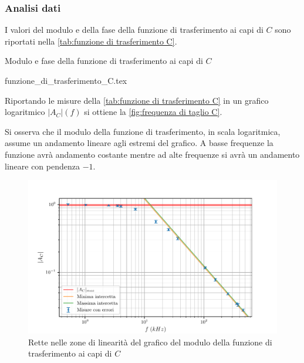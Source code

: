 \documentclass[11pt, a4paper]{article}
\numberwithin{equation}{section} %
\begin{document}
\subsubsection{Analisi dati}

I valori del modulo e della fase della funzione di trasferimento ai capi di $C$ sono riportati nella \autoref{tab:funzione di trasferimento C}.

\begin{table}[ht!]
    \centering
    \caption{Modulo e fase della funzione di trasferimento ai capi di $C$}
    {funzione_di_trasferimento_C.tex}
    \label{tab:funzione di trasferimento C}
\end{table}

\newpage

Riportando le misure della \autoref{tab:funzione di trasferimento C} in un grafico logaritmico $|A_{C}|(f)$ si ottiene la \autoref{fig:frequenza di taglio C}.



Si osserva che il modulo della funzione di trasferimento, in scala logaritmica, assume un andamento lineare agli estremi del grafico. A basse frequenze la funzione avrà andamento costante mentre ad alte frequenze si avrà un andamento lineare con pendenza $-1$.

\begin{figure}[ht!]
    \includegraphics{onda_sin_AC(f)_taglio.pdf}
    \caption{Rette nelle zone di linearità del grafico del modulo della funzione di trasferimento ai capi di $C$}
    \label{fig:frequenza di taglio C}
\end{figure}
\end{document}
